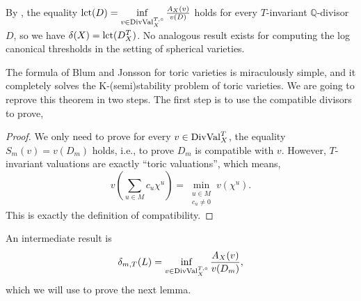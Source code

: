 \begin{remark*}
	By \cite[Proposition 7.3]{BJ_thre_val_kst}, the equality $\lct(D) = \inf_{v \in \TDValo_X} {A_X(v) \over v(D)}$ holds for every $T$-invariant $\mathbb{Q}$-divisor $D$, so we have $\delta(X) = \mathrm{lct}(D^T_X)$. No analogous result exists for computing the log canonical thresholds in the setting of spherical varieties. 

\end{remark*}

The formula of Blum and Jonsson for toric varieties is miraculously simple, and it completely solves the K-(semi)stability problem of toric varieties. We are going to reprove this theorem in two steps. The first step is to use the compatible divisors to prove,
\begin{proof}
	We only need to prove for every $v \in \mathrm{DivVal}^T_X$, the equality $S_m(v) = v(D_m)$ holds, i.e., to prove $D_m$ is compatible with $v$. However, $T$-invariant valuations are exactly ``toric valuations'', which means,
	\begin{equation*}
		v(\sum_{u \in M} c_u \chi^u) = \min_{\substack{u \in M \\ c_u \neq 0}} v(\chi^u).
	\end{equation*}
	This is exactly the definition of compatibility.
\end{proof}

An intermediate result is
\begin{equation}\label{eq:deltaTm}
	\delta_{m, T}(L) = \inf_{v \in \TDValo_X} {A_X(v) \over v(D_m)},
\end{equation}
which we will use to prove the next lemma.

